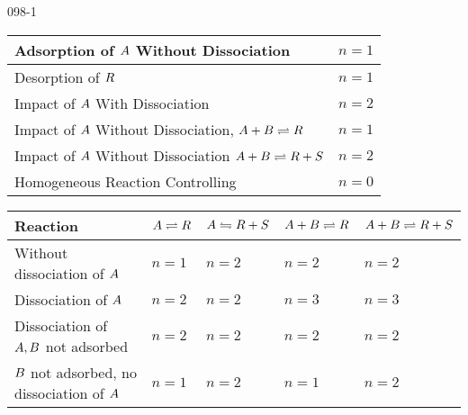 \begin{mitframe}{098-1}
    
\begin{center}
\begin{tabular}
{| >{\centering\arraybackslash}m{6cm} | >{\centering\arraybackslash}m{1cm} |}
\hline 
    Adsorption of $\helmholtz$ Without Dissociation & $n=1$ \\ \hline
	Desorption of $\gasconst$ & $n=1$ \\ \hline
    Impact of $\helmholtz$ With Dissociation & $n=2$ \\ \hline
	Impact of $\helmholtz$ Without Dissociation, $\helmholtz + \exergy \rightleftharpoons \gasconst$ & $n=1$ \\ \hline
	Impact of $\helmholtz$ Without Dissociation $\helmholtz + \exergy \rightleftharpoons \gasconst +\entropy$ & $n=2$\\ \hline
    Homogeneous Reaction Controlling & $n=0$ \\ \hline
\end{tabular}
\end{center}

\begin{center}
\begin{tabular}
{| >{\centering\arraybackslash}m{3cm} | >{\centering\arraybackslash}m{1.5cm} | >{\centering\arraybackslash}m{2cm} | >{\centering\arraybackslash}m{2cm} | >{\centering\arraybackslash}m{2.5cm} |}
\hline 
Reaction & $\helmholtz \rightleftharpoons \gasconst$ & $\helmholtz \leftrightharpoons \gasconst + \entropy$ & $\helmholtz + \exergy \rightleftharpoons \gasconst$ & $\helmholtz + \exergy \rightleftharpoons \gasconst + \entropy$ \\ \hline
Without dissociation of $\helmholtz$ & $n=1$ & $n=2$ & $n=2$ & $n=2$ \\ \hline
Dissociation of $\helmholtz$ & $n=2$ & $n=2$ & $n=3$ & $n=3$ \\ \hline
Dissociation of $\helmholtz, \exergy$ not adsorbed & $n=2$ & $n=2$ & $n=2$ & $n=2$ \\ \hline
$\exergy$ not adsorbed, no dissociation of $\helmholtz$ & $n=1$ & $n=2$ & $n=1$ & $n=2$ \\ \hline


\end{tabular}
\end{center}


\end{mitframe}